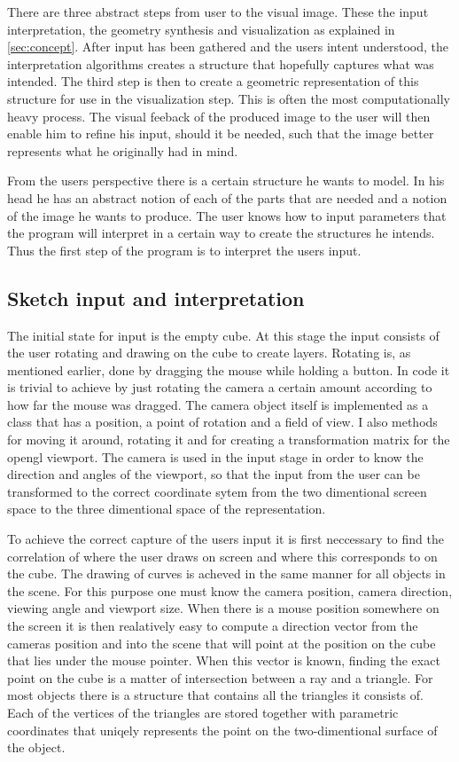 \documentclass[a4paper,12pt]{report}
\begin{document}
There are three abstract steps from user to the visual image. These the input interpretation, the geometry synthesis and visualization as explained in \ref{sec:concept}. After input has been gathered and the users intent understood, the interpretation algorithms creates a structure that hopefully captures what was intended. The third step is then to create a geometric representation of this structure for use in the visualization step. This is often the most computationally heavy process. The visual feeback of the produced image to the user will then enable him to refine his input, should it be needed, such that the image better represents what he originally had in mind. 

From the users perspective there is a certain structure he wants to model. In his head he has an abstract notion of each of the parts that are needed and a notion of the image he wants to produce. The user knows how to input parameters that the program will interpret in a certain way to create the structures he intends. Thus the first step of the program is to interpret the users input.

\subsection{Sketch input and interpretation}
The initial state for input is the empty cube. At this stage the input consists of the user rotating and drawing on the cube to create layers. Rotating is, as mentioned earlier, done by dragging the mouse while holding a button. In code it is trivial to achieve by just rotating the camera a certain amount according to how far the mouse was dragged. The camera object itself is implemented as a class that has a position, a point of rotation and a field of view. I also methods for moving it around, rotating it and for creating a transformation matrix for the opengl viewport. The camera is used in the input stage in order to know the direction and angles of the viewport, so that the input from the user can be transformed to the correct coordinate sytem from the two dimentional screen space to the three dimentional space of the representation.

 To achieve the correct capture of the users input it is first neccessary to find the correlation of where the user draws on screen and where this corresponds to on the cube. The drawing of curves is acheved in the same manner for all objects in the scene. For this purpose one must know the camera position, camera direction, viewing angle and viewport size. When there is a mouse position somewhere on the screen it is then realatively easy to compute a direction vector from the cameras position and into the scene that will point at the position on the cube that lies under the mouse pointer. When this vector is known, finding the exact point on the cube is a matter of intersection between a ray and a triangle. For most objects there is a structure that contains all the triangles it consists of. Each of the vertices of the triangles are stored together with parametric coordinates that uniqely represents the point on the two-dimentional surface of the object.
\end{document}
